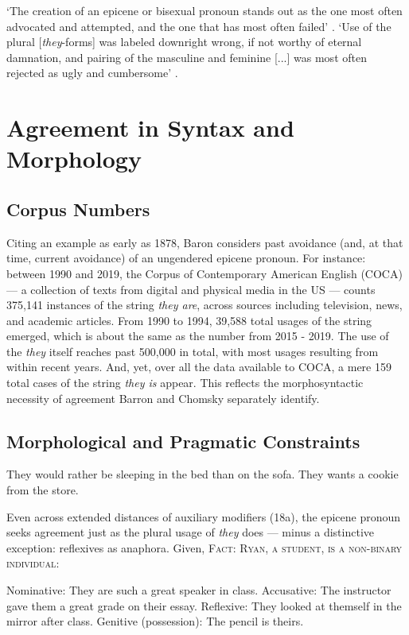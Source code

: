 \documentclass{article}
\begin{document}
\ea
\begin{xlist}
    \ex `The creation of an epicene or bisexual pronoun stands out as the one most often advocated and attempted, and the one that has most often failed' \citep[p.~83]{Baron}.
    \ex `Use of the plural [\textit{they}-forms] was labeled downright wrong, if not worthy of eternal damnation, and pairing of the masculine and feminine [...] was most often rejected as ugly and cumbersome' \citep[p.~83]{Baron}.
\end{xlist}
\z
\section{Agreement in Syntax and Morphology}

\subsection{Corpus Numbers}
Citing an example as early as 1878, Baron considers past avoidance (and, at that time, current avoidance) of an ungendered epicene pronoun. For instance: between 1990 and 2019, the Corpus of Contemporary American English (COCA) \citep{Davies} --- a collection of texts from digital and physical media in the US --- counts 375,141 instances of the string \textit{they are}, across sources including television, news, and academic articles. From 1990 to 1994, 39,588 total usages of the string emerged, which is about the same as the number from 2015 - 2019. The use of the \textit{they} itself reaches past 500,000 in total, with most usages resulting from within recent years. And, yet, over all the data available to COCA, a mere 159 total cases of the string \textit{they is} appear. This reflects the morphosyntactic necessity of agreement Barron and Chomsky separately identify.

\subsection{Morphological and Pragmatic Constraints}

\ea
\begin{xlist}
    \ex They would rather be sleeping in the bed than on the sofa.
    \ex *They wants a cookie from the store.
\end{xlist}
\z

Even across extended distances of auxiliary modifiers (18a), the epicene pronoun seeks agreement just as the plural usage of \textit{they} does --- minus a distinctive exception: reflexives as anaphora. Given, {\scshape Fact: Ryan, a student, is a non-binary individual}:
\
\ea
\begin{xlist}
    \ex Nominative: They are such a great speaker in class.
    \ex Accusative: The instructor gave them a great grade on their essay.
    \ex Reflexive: They\subs{r} looked at themself in the mirror after class.
    \ex Genitive (possession): The pencil is theirs\subs{r}.
\end{xlist}
\z
\end{document}
